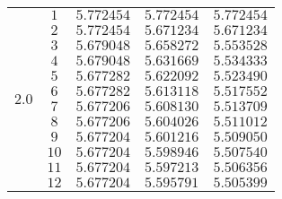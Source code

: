 \documentclass[
    a4paper, aps, twocolumn, floatfix, superscriptaddress,
    nofootinbib]{revtex4-1}
\newcommand{\1}{\mathds{1}}
\begin{document}
\begin{table}
\begin{ruledtabular}
\begin{tabular}{c|c|ccc}
                           &  $1$  & $5.772454$ & $5.772454$ & $5.772454$ \\
                           &  $2$  & $5.772454$ & $5.671234$ & $5.671234$ \\
                           &  $3$  & $5.679048$ & $5.658272$ & $5.553528$ \\
                           &  $4$  & $5.679048$ & $5.631669$ & $5.534333$ \\
                           &  $5$  & $5.677282$ & $5.622092$ & $5.523490$ \\
    \multirow{2}{*}{$2.0$} &  $6$  & $5.677282$ & $5.613118$ & $5.517552$ \\
                           &  $7$  & $5.677206$ & $5.608130$ & $5.513709$ \\
                           &  $8$  & $5.677206$ & $5.604026$ & $5.511012$ \\
                           &  $9$  & $5.677204$ & $5.601216$ & $5.509050$ \\
                           &  $10$ & $5.677204$ & $5.598946$ & $5.507540$ \\
                           &  $11$ & $5.677204$ & $5.597213$ & $5.506356$ \\
                           &  $12$ & $5.677204$ & $5.595791$ & $5.505399$
            \end{tabular}
        \end{ruledtabular}
        \label{tab:N2}
    \end{table}
\end{document}
